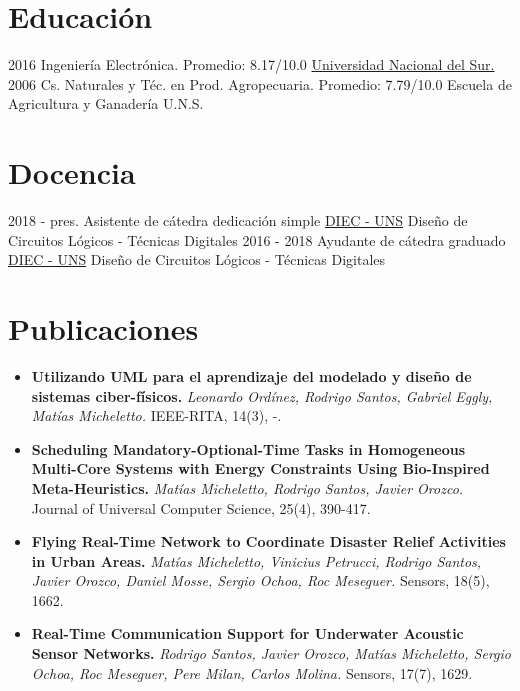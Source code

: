 \documentclass[letterpaper]{twentysecondcv} %
\begin{document}
\makeprofilefirst %

\section{Educación}
\begin{twenty}
	\twentyitem
    	{2016}
        {}
        {Ingeniería Electrónica.}
        {Promedio: 8.17/10.0}
        {\href{http://www.uns.edu.ar/}{Universidad Nacional del Sur.}}
        {}
	\twentyitem
    	{2006}
		{}
		{Cs. Naturales y Téc. en Prod. Agropecuaria.}
        {Promedio: 7.79/10.0}
        {Escuela de Agricultura y Ganadería U.N.S.}
        {}
\end{twenty}

\section{Docencia}
\begin{twenty}
    \twentyitem
    	{2018 - pres.}
		{}
        {Asistente de cátedra dedicación simple}
        {\href{http://www.diec.uns.edu.ar/}{DIEC - UNS}}
        {}
        {Diseño de Circuitos Lógicos - Técnicas Digitales}
    \twentyitem
    	{2016 - 2018}
		{}
        {Ayudante de cátedra graduado}
        {\href{http://www.diec.uns.edu.ar/}{DIEC - UNS}}
        {}
        {Diseño de Circuitos Lógicos - Técnicas Digitales}
\end{twenty}

\section{Publicaciones}
{\begin{itemize}
\item {\bf Utilizando UML para el aprendizaje del modelado y diseño de sistemas ciber-físicos.} \textit{Leonardo Ordínez, Rodrigo Santos, Gabriel Eggly, Matías Micheletto.}
IEEE-RITA, 14(3), -.
\item {\bf Scheduling Mandatory-Optional-Time Tasks in Homogeneous Multi-Core Systems with Energy Constraints Using Bio-Inspired Meta-Heuristics.} \textit{Matías Micheletto, Rodrigo Santos, Javier Orozco.} Journal of Universal Computer Science, 25(4), 390-417.
\item {\bf Flying Real-Time Network to Coordinate Disaster Relief Activities in Urban Areas.} \textit{Matías Micheletto, Vinicius Petrucci, Rodrigo Santos, Javier Orozco, Daniel Mosse, Sergio Ochoa, Roc Meseguer.} Sensors, 18(5), 1662.
\item {\bf Real-Time Communication Support for Underwater Acoustic Sensor Networks.} \textit{Rodrigo Santos, Javier Orozco, Matías Micheletto, Sergio Ochoa, Roc Meseguer, Pere Milan, Carlos Molina.} Sensors, 17(7), 1629.
\end{itemize}}
\end{document}

